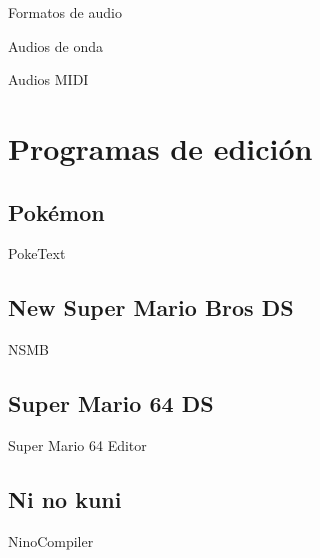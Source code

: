 \begin{frame}{Formatos de audio}
\end{frame}

\begin{frame}{Audios de onda}
\end{frame}

\begin{frame}{Audios MIDI}
\end{frame}

\section{Programas de edición}
\subsection{Pokémon}
\begin{frame}{PokeText}
\end{frame}

\subsection{New Super Mario Bros DS}
\begin{frame}{NSMB}
\end{frame}

\subsection{Super Mario 64 DS}
\begin{frame}{Super Mario 64 Editor}
\end{frame}

\subsection{Ni no kuni}
\begin{frame}{NinoCompiler}
\end{frame}
